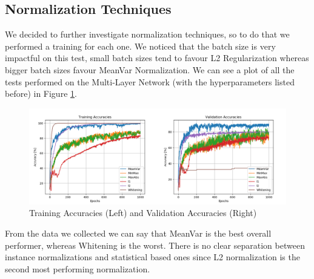 \documentclass[10pt,a4paper]{report}
\begin{document}
\subsection{Normalization Techniques}
We decided to further investigate normalization techniques, so to do that we performed a training for each one. We noticed that the batch size is very impactful on this test, small batch sizes tend to favour L2 Regularization whereas bigger batch sizes favour MeanVar Normalization. We can see a plot of all the tests performed on the Multi-Layer Network (with the hyperparameters listed before) in Figure \ref{fig:norm_test}.
\begin{figure}[!ht]
\centering
\includegraphics[width=\linewidth]{accs.png}
\caption{Training Accuracies (Left) and Validation Accuracies (Right)}
\label{fig:norm_test}
\end{figure}
From the data we collected we can say that MeanVar is the best overall performer, whereas Whitening is the worst. There is no clear separation between instance normalizations and statistical based ones since L2 normalization is the second most performing normalization.  
\end{document}

